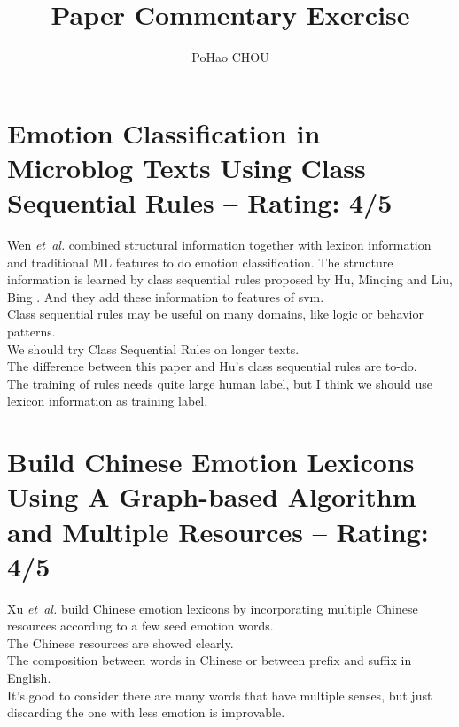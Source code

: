 \documentclass[a4paper]{article}
\title{Paper Commentary Exercise}
\author{PoHao CHOU}
\begin{document}
\maketitle
\section{Emotion Classification in Microblog Texts Using Class Sequential Rules -- Rating: 4/5}
Wen \emph{et~al.} \cite{Wen:AAAI14} combined structural information together with lexicon information and traditional ML features to do emotion classification. The structure information is learned by class sequential rules proposed by Hu, Minqing and Liu, Bing \cite{Hu:AAAI06}. And they add these information to features of svm.\\

Class sequential rules may be useful on many domains, like logic or behavior patterns.\\

We should try Class Sequential Rules on longer texts.\\

The difference between this paper and Hu's class sequential rules are to-do.\cite{Hu:AAAI06} \\

The training of rules needs quite large human label, but I think we should use lexicon information as training label.



\section{Build Chinese Emotion Lexicons Using A Graph-based Algorithm and Multiple Resources -- Rating: 4/5}
Xu \emph{et~al.} \cite{Xu:COLING10} build Chinese emotion lexicons by incorporating multiple Chinese resources according to a few seed emotion words. \\

The Chinese resources are showed clearly.\\

The composition between words in Chinese or between prefix and suffix in English.\\ 

It's good to consider there are many words that have multiple senses, but just discarding the one with less emotion is improvable.\\
\end{document}

